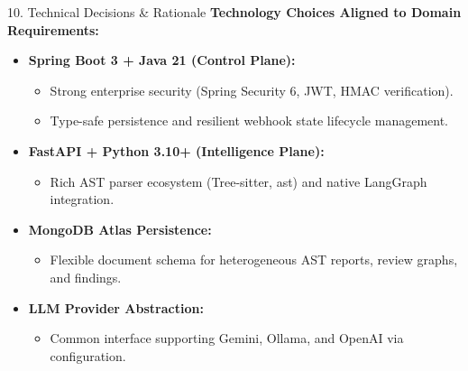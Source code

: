 \documentclass[aspectratio=169,11pt]{beamer}
\begin{document}
\begin{frame}{10. Technical Decisions \& Rationale}
  \textbf{Technology Choices Aligned to Domain Requirements:}
  \vspace{0.25cm}
  \begin{itemize}
    \item \textbf{Spring Boot 3 + Java 21 (Control Plane):}
      \begin{itemize}
        \item Strong enterprise security (Spring Security 6, JWT, HMAC verification).
        \item Type-safe persistence and resilient webhook state lifecycle management.
      \end{itemize}
    \vspace{0.2cm}
    \item \textbf{FastAPI + Python 3.10+ (Intelligence Plane):}
      \begin{itemize}
        \item Rich AST parser ecosystem (Tree-sitter, ast) and native LangGraph integration.
      \end{itemize}
    \vspace{0.2cm}
    \item \textbf{MongoDB Atlas Persistence:}
      \begin{itemize}
        \item Flexible document schema for heterogeneous AST reports, review graphs, and findings.
      \end{itemize}
    \vspace{0.2cm}
    \item \textbf{LLM Provider Abstraction:}
      \begin{itemize}
        \item Common interface supporting Gemini, Ollama, and OpenAI via configuration.
      \end{itemize}
  \end{itemize}
\end{frame}
\end{document}
